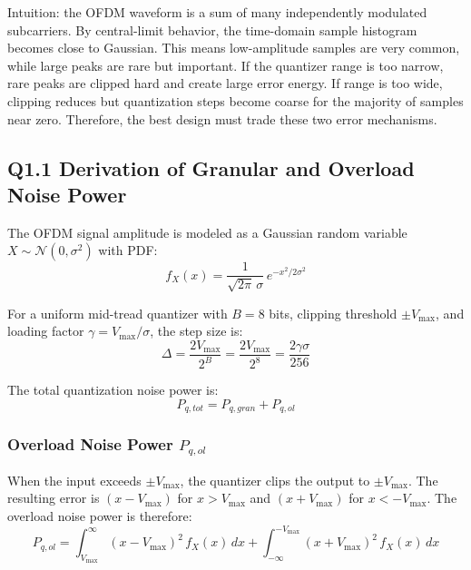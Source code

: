 \documentclass{article}
\begin{document}
Intuition: the OFDM waveform is a sum of many independently modulated subcarriers. By central-limit behavior, the time-domain sample histogram becomes close to Gaussian. This means low-amplitude samples are very common, while large peaks are rare but important. If the quantizer range is too narrow, rare peaks are clipped hard and create large error energy. If range is too wide, clipping reduces but quantization steps become coarse for the majority of samples near zero. Therefore, the best design must trade these two error mechanisms.

\subsection*{Q1.1 Derivation of Granular and Overload Noise Power}

The OFDM signal amplitude is modeled as a Gaussian random variable 
$X \sim \mathcal{N}(0, \sigma^2)$ with PDF:
\begin{equation}
    f_X(x) = \frac{1}{\sqrt{2\pi}\,\sigma}\,e^{-x^2/2\sigma^2}
\end{equation}

For a uniform mid-tread quantizer with $B = 8$ bits, clipping threshold 
$\pm V_{\max}$, and loading factor $\gamma = V_{\max}/\sigma$, the step 
size is:
\begin{equation}
    \Delta = \frac{2V_{\max}}{2^B} = \frac{2V_{\max}}{2^8} = \frac{2\gamma\sigma}{256}
\end{equation}

The total quantization noise power is:
\begin{equation}
    P_{q,tot} = P_{q,gran} + P_{q,ol}
\end{equation}

\subsubsection*{Overload Noise Power $P_{q,ol}$}

When the input exceeds $\pm V_{\max}$, the quantizer clips the output 
to $\pm V_{\max}$. The resulting error is $(x - V_{\max})$ for 
$x > V_{\max}$ and $(x + V_{\max})$ for $x < -V_{\max}$. The overload 
noise power is therefore:
\begin{equation}
    P_{q,ol} = \int_{V_{\max}}^{\infty} (x - V_{\max})^2\,f_X(x)\,dx
             + \int_{-\infty}^{-V_{\max}} (x + V_{\max})^2\,f_X(x)\,dx
\end{equation}
\end{document}
